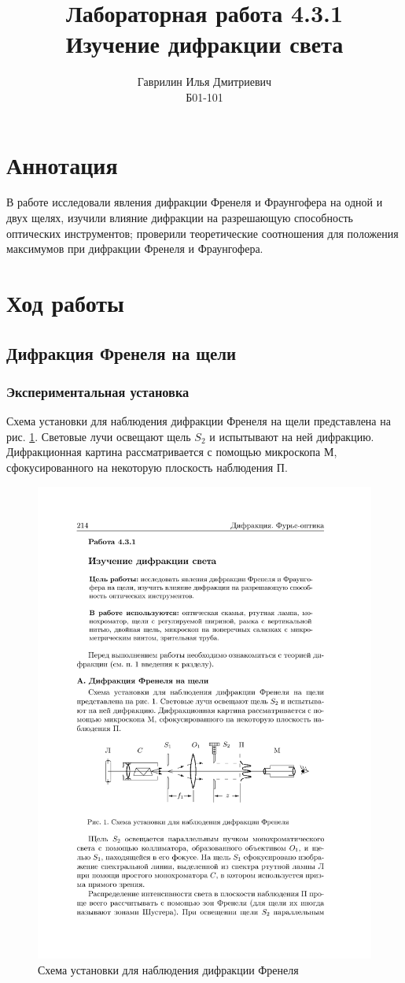 \documentclass[a4paper, 12pt]{article}%
\author{Гаврилин Илья Дмитриевич \\
	Б01-101}
\title{\textbf{Лабораторная работа 4.3.1\\ 
		Изучение дифракции света}}
\begin{document}
	\maketitle
	\section{Аннотация}
	В работе исследовали явления дифракции Френеля и Фраунгофера на одной и двух
	щелях, изучили влияние дифракции на разрешающую способность оптических инструментов; проверили теоретические соотношения для положения максимумов при дифракции Френеля и Фраунгофера.
	\section{Ход работы}
	\subsection{Дифракция Френеля на щели}
	
	\subsubsection{Экспериментальная установка}
	
	Схема установки для наблюдения дифракции Френеля на щели представлена на рис. \ref{labA}. Световые лучи освещают щель $ S_2 $ и испытывают на ней дифракцию. Дифракционная картина рассматривается с помощью микроскопа М, сфокусированного на некоторую плоскость наблюдения П.
	
	\begin{figure}[h!]
		\centering
		\includegraphics[width=0.8\linewidth]{a.pdf}
		\caption{Схема установки для наблюдения дифракции Френеля}
		\label{labA}
	\end{figure}
	
\end{document}

